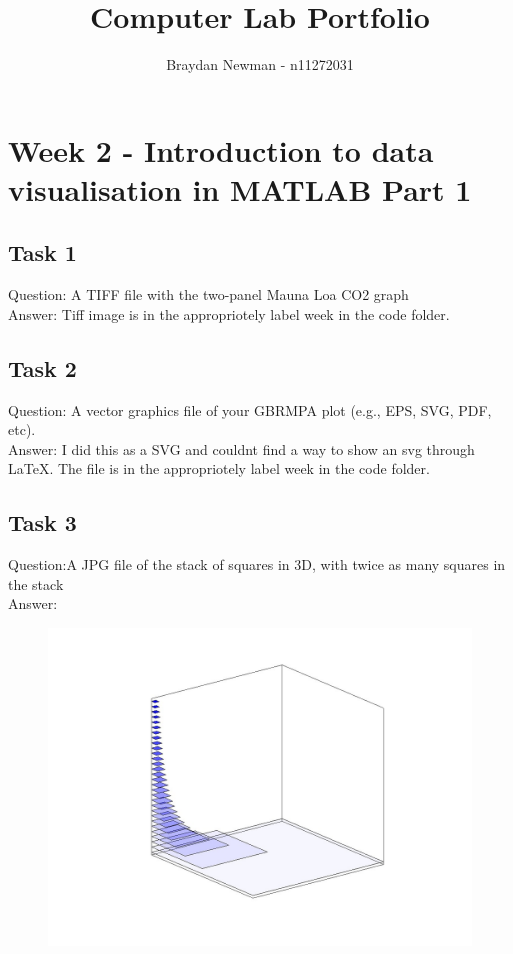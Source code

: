 \documentclass[12pt,a4paper]{report}
\author{Braydan Newman - n11272031}
\title{Computer Lab Portfolio}
\begin{document}
\maketitle
\tableofcontents

\newpage

\section{Week 2 - Introduction to data visualisation in MATLAB Part 1}

\subsection{Task 1}
Question: A TIFF file with the two-panel Mauna Loa CO2 graph
\\
Answer: Tiff image is in the appropriotely label week in the code folder.

\subsection{Task 2}
Question: A vector graphics file of your GBRMPA plot (e.g., EPS, SVG, PDF, etc).
\\
Answer: I did this as a SVG and couldnt find a way to show an svg through LaTeX. The file is in the appropriotely label week in the code folder.

\subsection{Task 3}

Question:A JPG file of the stack of squares in 3D, with twice as many squares in the stack
\\
Answer:
\begin{figure}[H]
\centering
\includegraphics[width=\textwidth]{../Code/Week 2/stackSquares.jpg}
\end{figure}
\end{document}
